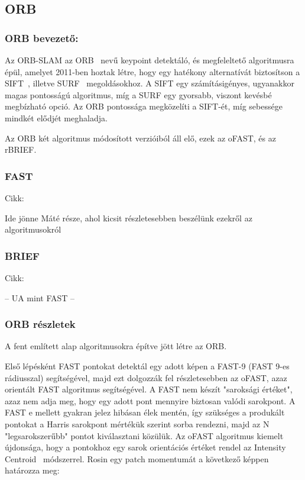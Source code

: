 \subsection{ORB}

\subsubsection{ORB bevezető:}

Az ORB-SLAM az ORB~\cite{rublee2011orb} nevű keypoint detektáló, és megfeleltető algoritmusra épül, amelyet 2011-ben hoztak létre, hogy egy hatékony alternatívát biztosítson a SIFT~\cite{lowe2004distinctive}, illetve SURF~\cite{bay2006surf} megoldásokhoz.
A SIFT egy számításigényes, ugyanakkor magas pontosságú algoritmus, míg a SURF egy gyorsabb, viszont kevésbé megbízható opció.
Az ORB pontossága megközelíti a SIFT-ét, míg sebessége mindkét elődjét meghaladja.

Az ORB két algoritmus módosított verzióiból áll elő, ezek az oFAST, és az rBRIEF.

\subsubsection{FAST}

Cikk:\cite{rosten2006machine}

Ide jönne Máté része, ahol kicsit részletesebben beszélünk ezekről az algoritmusokról

\subsubsection{BRIEF}

Cikk:\cite{rublee2011orb}

-- UA mint FAST --

\subsubsection{ORB részletek}

A fent említett alap algoritmusokra építve jött létre az ORB.

Első lépésként FAST pontokat detektál egy adott képen a FAST-9 (FAST 9-es rádiusszal) segítségével, majd ezt dolgozzák fel részletesebben az oFAST, azaz orientált FAST algoritmus segítségével.
A FAST nem készít "saroksági értéket", azaz nem adja meg, hogy egy adott pont mennyire biztosan valódi sarokpont.
A FAST e mellett gyakran jelez hibásan élek mentén, így szükséges a produkált pontokat a Harris sarokpont mértékük szerint sorba rendezni, majd az N "legsarokszerűbb" pontot kiválasztani közülük.
Az oFAST algoritmus kiemelt újdonsága, hogy a pontokhoz egy sarok orientációs értéket rendel az Intensity Centroid~\cite{rosin1999measuring} módszerrel.
Rosin egy patch momentumát a következő képpen határozza meg:

